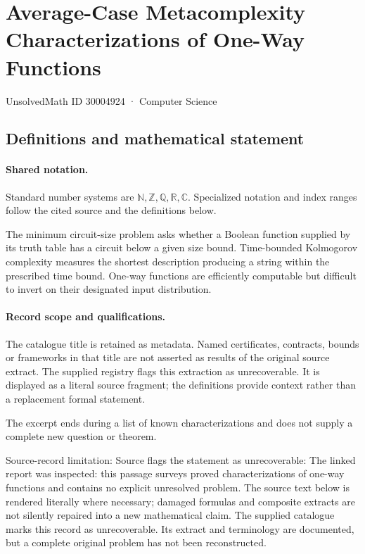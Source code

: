 \documentclass[11pt]{article}
\begin{document}
\setcounter{section}{30004923}
\section{Average-Case Metacomplexity Characterizations of One-Way Functions}\label{30004924}
{\small\sffamily UnsolvedMath ID 30004924 · Computer Science}
\subsection{Definitions and mathematical statement}

\paragraph{Shared notation.}Standard number systems are $\mathbb N,\mathbb Z,\mathbb Q,\mathbb R,\mathbb C$. Specialized notation and index ranges follow the cited source and the definitions below.


The minimum circuit-size problem asks whether a Boolean function supplied by its truth table has a circuit below a given size bound. Time-bounded Kolmogorov complexity measures the shortest description producing a string within the prescribed time bound. One-way functions are efficiently computable but difficult to invert on their designated input distribution.
\paragraph{Record scope and qualifications.}
The catalogue title is retained as metadata. Named certificates, contracts, bounds or frameworks in that title are not asserted as results of the original source extract.
The supplied registry flags this extraction as unrecoverable. It is displayed as a literal source fragment; the definitions provide context rather than a replacement formal statement.

The excerpt ends during a list of known characterizations and does not supply a complete new question or theorem.

Source-record limitation: Source flags the statement as unrecoverable: The linked report was inspected: this passage surveys proved characterizations of one-way functions and contains no explicit unresolved problem.
The source text below is rendered literally where necessary; damaged formulas and composite extracts are not silently repaired into a new mathematical claim.
The supplied catalogue marks this record as unrecoverable. Its extract and terminology are documented, but a complete original problem has not been reconstructed.
\end{document}
